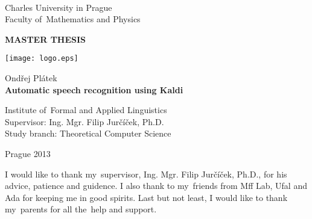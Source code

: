 
\begin{titlepage}
\begin{center}
\ \\

\vspace{15mm}

\large
Charles University in Prague\\
Faculty of~Mathematics and Physics\\

\vspace{5mm}

{\Large\bf MASTER THESIS}

\vspace{15mm}

\texttt{[image: logo.eps]} %

\vspace{20mm}
{\Large Ondřej Plátek}\\ 

\vspace{5mm}
{\Large\bf Automatic speech recognition using Kaldi}

\vspace{20mm}
\large
\noindent
Institute of~Formal and Applied Linguistics\\
\noindent
Supervisor: Ing. Mgr. Filip Jurčíček, Ph.D.\\
\noindent
Study branch: Theoretical Computer Science\\
\end{center}
\vspace{20mm}
\begin{center}
Prague 2013
\end{center}

\end{titlepage} %

\newpage

\normalsize %
\vspace{10mm} 

\noindent I would like to thank my~supervisor, Ing. Mgr. Filip Jurčíček, Ph.D., for his advice, patience and guidence. I also thank to my~friends from Mff Lab, Ufal and Ada for keeping me in good spirits. Last but not least, I would like to thank my~parents for all the~help and support.



